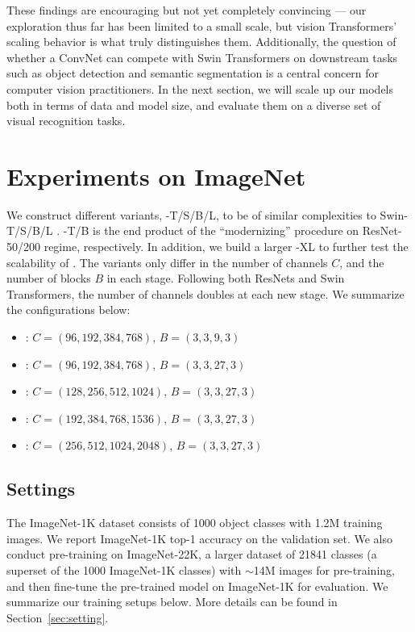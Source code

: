 These findings are encouraging but not yet completely convincing --- our exploration thus far has been limited to a small scale, but vision Transformers' scaling behavior is what truly distinguishes them. Additionally, the question of whether a ConvNet can compete with Swin Transformers on downstream tasks such as object detection and semantic segmentation is a central concern for computer vision practitioners.
In the next section, we will scale up our \cnn{} models both in terms of data and model size, and evaluate them on a diverse set of visual recognition tasks.


\section{Experiments on ImageNet}
\label{sec:convnext_config}
 We construct different \cnn{} variants, \cnn{}-T/S/B/L, to be of similar complexities to Swin-T/S/B/L \cite{Liu2021swin}. \cnn{}-T/B is the end product of the ``modernizing'' procedure on ResNet-50/200 regime, respectively. In addition, we build a larger \cnn{}-XL to further test the scalability of \cnn{}. The variants only differ in the number of channels $C$, and the number of blocks $B$ in each stage. Following both ResNets and Swin Transformers, the number of channels doubles at each new stage. We summarize the configurations below:
\begin{itemize}[leftmargin=-.1ex]
\setlength\itemsep{-.2em}
\item[]\cb{}: $C=(96,192,384,768)$, $B=(3,3,9,3)$
\item[]\cb{}: $C=(96,192,384,768)$, $B=(3,3,27,3)$
\item[]\cb{}: $C=(128,256,512,1024)$, $B=(3,3,27,3)$
\item[]\cb{}: $C=(192,384,768,1536)$, $B=(3,3,27,3)$
\item[]\cb{}: $C=(256,512,1024,2048)$, $B=(3,3,27,3)$
\end{itemize}


\subsection{Settings}
The ImageNet-1K dataset consists of 1000 object classes with 1.2M training images. We report ImageNet-1K top-1 accuracy on the validation set. We also conduct pre-training on ImageNet-22K, a larger dataset of 21841 classes (a superset of the 1000 ImageNet-1K classes) with $\sim$14M images for pre-training, and then fine-tune the pre-trained model on ImageNet-1K for evaluation.  We summarize our training setups below. More details can be found in Section~\ref{sec:setting}. 

